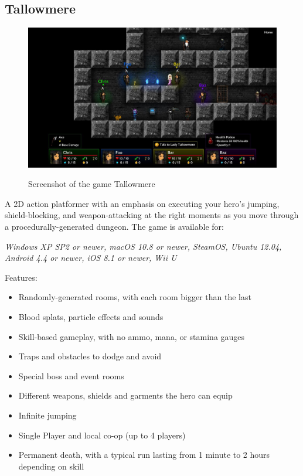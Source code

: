 \documentclass[12p]{article}
\begin{document}
\subsection{Tallowmere} \label{StateOfTheArt_Tallowmere}

\begin{figure}[ht]
    \center
    \includegraphics[width=1\textwidth]{StateOfTheArtScreenshots/tallowmere}
    \label{StateOfTheArt_Screenshots_Tallowmere}
    \caption{Screenshot of the game Tallowmere \cite{TallowmereScreenshot}}
\end{figure}

A 2D action platformer with an emphasis on executing your hero's jumping, shield-blocking, and weapon-attacking at the right moments as you move through a procedurally-generated dungeon. The game is available for:

\emph{Windows XP SP2 or newer, macOS 10.8 or newer, SteamOS, Ubuntu 12.04, Android 4.4 or newer, iOS 8.1 or newer, Wii U}

Features:

\begin{itemize}
    \item Randomly-generated rooms, with each room bigger than the last
    \item Blood splats, particle effects and sounds
    \item Skill-based gameplay, with no ammo, mana, or stamina gauges
    \item Traps and obstacles to dodge and avoid
    \item Special boss and event rooms
    \item Different weapons, shields and garments the hero can equip
    \item Infinite jumping
    \item Single Player and local co-op (up to 4 players)
    \item Permanent death, with a typical run lasting from 1 minute to 2 hours depending on skill
\end{itemize}
\end{document}
